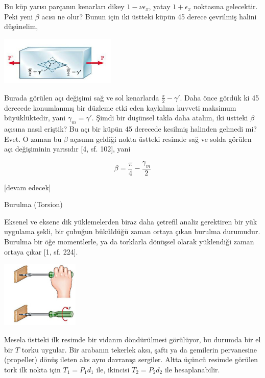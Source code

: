 \documentclass[12pt,fleqn]{article}\usepackage{../../common}
\begin{document}
Bu küp yarısı parçanın kenarları dikey $1-\nu \epsilon_x$, yatay $1 + \epsilon_x$
noktasına gelecektir. Peki yeni $\beta$ acısı ne olur? Bunun için iki
üstteki küpün 45 derece çevrilmiş halini düşünelim,

\includegraphics[width=15em]{phy_020_strs_06_09.jpg}

Burada görülen açı değişimi sağ ve sol kenarlarda $\frac{\pi}{2} - \gamma'$.
Daha önce gördük ki 45 derecede konumlanmış bir düzleme etki eden kaykılma
kuvveti maksimum büyüklüktedir, yani $\gamma_m = \gamma'$. Şimdi bir düşünsel
takla daha atalım, iki üstteki $\beta$ açısına nasıl eriştik? Bu açı bir küpün
45 derecede kesilmiş halinden gelmedi mi? Evet. O zaman bu $\beta$ açısının
geldiği nokta üstteki resimde sağ ve solda görülen açı değişiminin yarısıdır
[4, sf. 102], yani

$$
\beta = \frac{\pi}{4} - \frac{\gamma_m}{2}
$$


[devam edecek]

















Burulma (Torsion)

Eksenel ve eksene dik yüklemelerden biraz daha çetrefil analiz gerektiren bir
yük uygulama şekli, bir çubuğun büküldüğü zaman ortaya çıkan burulma durumudur.
Burulma bir öğe momentlerle, ya da torklarla dönüşsel olarak yüklendiği zaman
ortaya çıkar [1, sf. 224].

\includegraphics[width=10em]{phy_020_strs_06_01.jpg}

Mesela üstteki ilk resimde bir vidanın döndürülmesi görülüyor, bu durumda bir el
bir $T$ torku uygular. Bir arabanın tekerlek aksı, şaftı ya da gemilerin
pervanesine (propeller) dönüş ileten aks aynı davranışı sergiler.  Altta üçüncü
resimde görülen tork ilk nokta için $T_1 = P_1 d_1$ ile, ikincisi $T_2 = P_2
d_2$ ile hesaplanabilir.
\end{document}
